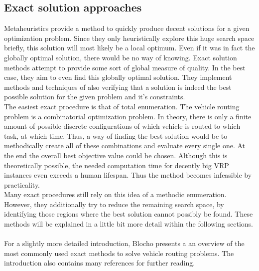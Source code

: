 
\subsection{Exact solution approaches}\label{sec:exact}

Metaheuristics provide a method to quickly produce decent solutions for a given optimization problem. Since they only heuristically explore this huge search space briefly, this solution will most likely be a local optimum. Even if it was in fact the globally optimal solution, there would be no way of knowing. Exact solution methods attempt to provide some sort of global measure of quality. In the best case, they aim to even find this globally optimal solution. They implement methods and techniques of also verifying that a solution is indeed the best possible solution for the given problem and it's constraints.\\
The easiest exact procedure is that of total enumeration. The vehicle routing problem is a combinatorial optimization problem. In theory, there is only a finite amount of possible discrete configurations of which vehicle is routed to which task, at which time. Thus, a way of finding the best solution would be to methodically create all of these combinations and evaluate every single one. At the end the overall best objective value could be chosen. Although this is theoretically possible, the needed computation time for decently big VRP instances even exceeds a human lifespan. Thus the method becomes infeasible by practicality.\\ 
Many exact procedures still rely on this idea of a methodic enumeration. However, they additionally try to reduce the remaining search space, by identifying those regions where the best solution cannot possibly be found. These methods will be explained in a little bit more detail within the following sections.\\ \\
For a slightly more detailed introduction, Blocho \cite{blocho_chapter_2020} presents a an overview of the most commonly used exact methods to solve vehicle routing problems. The introduction also contains many references for further reading.

